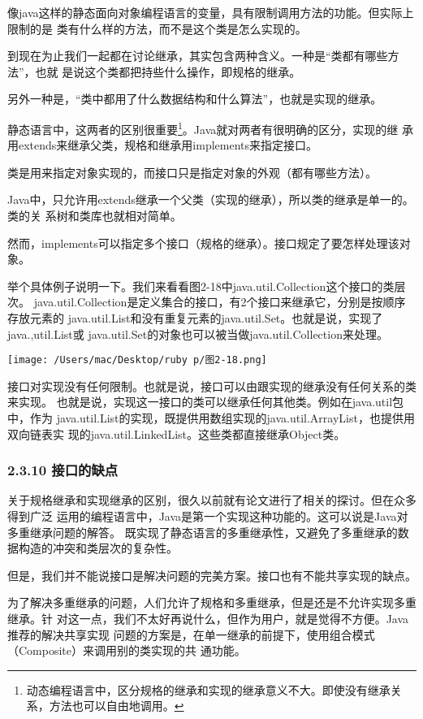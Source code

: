 \documentclass[11pt]{ctexart}
\begin{document}
像java这样的静态面向对象编程语言的变量，具有限制调用方法的功能。但实际上限制的是
类有什么样的方法，而不是这个类是怎么实现的。

到现在为止我们一起都在讨论继承，其实包含两种含义。一种是“类都有哪些方法”，也就
是说这个类都把持些什么操作，即规格的继承。

另外一种是，“类中都用了什么数据结构和什么算法”，也就是实现的继承。

静态语言中，这两者的区别很重要\footnote{动态编程语言中，区分规格的继承和实现的继承意义不大。即使没有继承关
系，方法也可以自由地调用。}。Java就对两者有很明确的区分，实现的继
承用extends来继承父类，规格和继承用implements来指定接口。

类是用来指定对象实现的，而接口只是指定对象的外观（都有哪些方法）。

Java中，只允许用extends继承一个父类（实现的继承），所以类的继承是单一的。类的关
系树和类库也就相对简单。

然而，implements可以指定多个接口（规格的继承）。接口规定了要怎样处理该对象。

举个具体例子说明一下。我们来看看图2-18中java.util.Collection这个接口的类层次。
java.util.Collection是定义集合的接口，有2个接口来继承它，分别是按顺序存放元素的
java.util.List和没有重复元素的java.util.Set。也就是说，实现了java.,util.List或
java.util.Set的对象也可以被当做java.util.Collection来处理。


\begin{center}
\texttt{[image: /Users/mac/Desktop/ruby p/图2-18.png]}
\end{center}
接口对实现没有任何限制。也就是说，接口可以由跟实现的继承没有任何关系的类来实现。
也就是说，实现这一接口的类可以继承任何其他类。例如在java.util包中，作为
java.util.List的实现，既提供用数组实现的java.util.ArrayList，也提供用双向链表实
现的java.util.LinkedList。这些类都直接继承Object类。
\subsubsection{2.3.10 接口的缺点}
\label{sec:org9e686ce}

关于规格继承和实现继承的区别，很久以前就有论文进行了相关的探讨。但在众多得到广泛
运用的编程语言中，Java是第一个实现这种功能的。这可以说是Java对多重继承问题的解答。
既实现了静态语言的多重继承性，又避免了多重继承的数据构造的冲突和类层次的复杂性。

但是，我们并不能说接口是解决问题的完美方案。接口也有不能共享实现的缺点。

为了解决多重继承的问题，人们允许了规格和多重继承，但是还是不允许实现多重继承。针
对这一点，我们不太好再说什么，但作为用户，就是觉得不方便。Java推荐的解决共享实现
问题的方案是，在单一继承的前提下，使用组合模式（Composite）来调用别的类实现的共
通功能。
\end{document}
